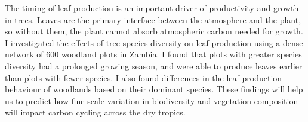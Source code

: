 The timing of leaf production is an important driver of productivity and growth in trees. Leaves are the primary interface between the atmosphere and the plant, so without them, the plant cannot absorb atmospheric carbon needed for growth. I investigated the effects of tree species diversity on leaf production using a dense network of \textapprox{}600 woodland plots in Zambia. I found that plots with greater species diversity had a prolonged growing season, and were able to produce leaves earlier than plots with fewer species. I also found differences in the leaf production behaviour of woodlands based on their dominant species. These findings will help us to predict how fine-scale variation in biodiversity and vegetation composition will impact carbon cycling across the dry tropics.



